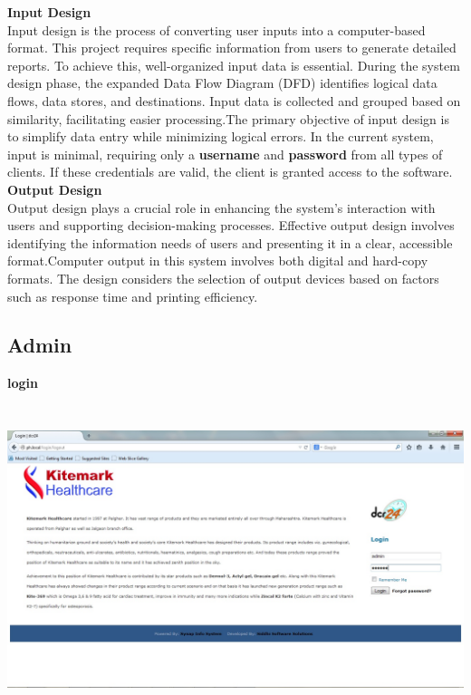 \textbf{Input Design}\\
Input design is the process of converting user inputs into a computer-based format. This project requires specific information from users to generate detailed reports. To achieve this, well-organized input data is essential. During the system design phase, the expanded Data Flow Diagram (DFD) identifies logical data flows, data stores, and destinations. Input data is collected and grouped based on similarity, facilitating easier processing.The primary objective of input design is to simplify data entry while minimizing logical errors. In the current system, input is minimal, requiring only a \textbf{username} and \textbf{password} from all types of clients. If these credentials are valid, the client is granted access to the software.\\
\textbf{Output Design}\\
Output design plays a crucial role in enhancing the system’s interaction with users and supporting decision-making processes. Effective output design involves identifying the information needs of users and presenting it in a clear, accessible format.Computer output in this system involves both digital and hard-copy formats. The design considers the selection of output devices based on factors such as response time and printing efficiency.
		
		
\subsection{Admin}
\pagebreak
\textbf{login}
\begin{center}
\includegraphics[height=9cm,width=14cm]{Admin/login.jpg}
\end{center}


